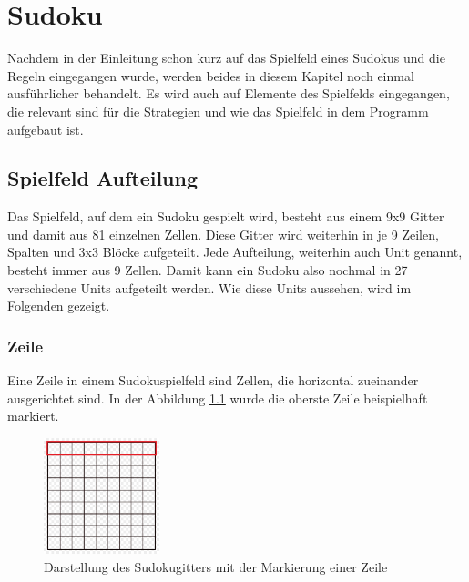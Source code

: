 

\chapter{Sudoku}
Nachdem in der Einleitung schon kurz auf das Spielfeld eines Sudokus und die Regeln eingegangen wurde, werden beides in diesem Kapitel noch einmal ausführlicher behandelt. Es wird auch auf Elemente des Spielfelds eingegangen, die relevant sind für die Strategien und wie das Spielfeld in dem Programm aufgebaut ist. 


\section{Spielfeld Aufteilung}
Das Spielfeld, auf dem ein Sudoku gespielt wird, besteht aus einem 9x9 Gitter und damit aus 81 einzelnen Zellen. Diese Gitter wird weiterhin in je 9 Zeilen, Spalten und 3x3 Blöcke aufgeteilt. Jede Aufteilung, weiterhin auch Unit genannt, besteht immer aus 9 Zellen. Damit kann ein Sudoku also nochmal in 27 verschiedene Units aufgeteilt werden. Wie diese Units aussehen, wird im Folgenden gezeigt.

\subsection{Zeile}
Eine Zeile in einem Sudokuspielfeld sind Zellen, die horizontal zueinander ausgerichtet sind. In der Abbildung \ref{fig:SudokugitterZeile} wurde die oberste Zeile beispielhaft markiert.
\begin{figure}[htbp]
	\centering
	\includegraphics[width=0.3\textwidth]{images/sudokugitterZeile.jpg}
	\caption{Darstellung des Sudokugitters mit der Markierung einer Zeile}
	\label{fig:SudokugitterZeile}
\end{figure}

